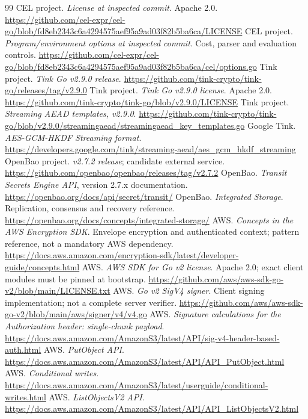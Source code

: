\documentclass[11pt,a4paper]{article}
\begin{document}
\begin{thebibliography}{99}
 CEL project. \emph{License at inspected commit}. Apache 2.0. \url{https://github.com/cel-expr/cel-go/blob/fd8eb2343c6a4294575aef95a9ad03f82b5ba6ca/LICENSE}
 CEL project. \emph{Program/environment options at inspected commit}. Cost, parser and evaluation controls. \url{https://github.com/cel-expr/cel-go/blob/fd8eb2343c6a4294575aef95a9ad03f82b5ba6ca/cel/options.go}
 Tink project. \emph{Tink Go v2.9.0 release}. \url{https://github.com/tink-crypto/tink-go/releases/tag/v2.9.0}
 Tink project. \emph{Tink Go v2.9.0 license}. Apache 2.0. \url{https://github.com/tink-crypto/tink-go/blob/v2.9.0/LICENSE}
 Tink project. \emph{Streaming AEAD templates, v2.9.0}. \url{https://github.com/tink-crypto/tink-go/blob/v2.9.0/streamingaead/streamingaead_key_templates.go}
 Google Tink. \emph{AES-GCM-HKDF Streaming format}. \url{https://developers.google.com/tink/streaming-aead/aes_gcm_hkdf_streaming}
 OpenBao project. \emph{v2.7.2 release}; candidate external service. \url{https://github.com/openbao/openbao/releases/tag/v2.7.2}
 OpenBao. \emph{Transit Secrets Engine API}, version 2.7.x documentation. \url{https://openbao.org/docs/api/secret/transit/}
 OpenBao. \emph{Integrated Storage}. Replication, consensus and recovery reference. \url{https://openbao.org/docs/concepts/integrated-storage/}
 AWS. \emph{Concepts in the AWS Encryption SDK}. Envelope encryption and authenticated context; pattern reference, not a mandatory AWS dependency. \url{https://docs.aws.amazon.com/encryption-sdk/latest/developer-guide/concepts.html}
 AWS. \emph{AWS SDK for Go v2 license}. Apache 2.0; exact client modules must be pinned at bootstrap. \url{https://github.com/aws/aws-sdk-go-v2/blob/main/LICENSE.txt}
 AWS. \emph{Go v2 SigV4 signer}. Client signing implementation; not a complete server verifier. \url{https://github.com/aws/aws-sdk-go-v2/blob/main/aws/signer/v4/v4.go}
 AWS. \emph{Signature calculations for the Authorization header: single-chunk payload}. \url{https://docs.aws.amazon.com/AmazonS3/latest/API/sig-v4-header-based-auth.html}
 AWS. \emph{PutObject API}. \url{https://docs.aws.amazon.com/AmazonS3/latest/API/API_PutObject.html}
 AWS. \emph{Conditional writes}. \url{https://docs.aws.amazon.com/AmazonS3/latest/userguide/conditional-writes.html}
 AWS. \emph{ListObjectsV2 API}. \url{https://docs.aws.amazon.com/AmazonS3/latest/API/API_ListObjectsV2.html}

\end{thebibliography}
\end{document}
